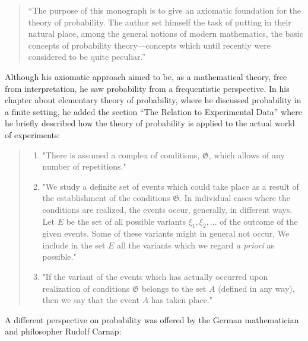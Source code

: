 \documentclass[
]{report}
\theoremstyle{definition}
\begin{document}
\begin{quote}
“The purpose of this monograph is to give an axiomatic foundation for the theory of probability. The author set himself the task of putting in their natural place, among the general notions of modern mathematics, the basic concepts of probability theory—concepts which until recently were considered to be quite peculiar.” \cite{a_n_kolmogorov_foundations_1950}
\end{quote}

Although his axiomatic approach aimed to be, as a mathematical theory,
free from interpretation, he saw probability from a frequentistic
perspective. In his chapter about elementary theory of probability,
where he discussed probability in a finite setting, he added the section
``The Relation to Experimental Data'' where he briefly described how the
theory of probability is applied to the actual world of experiments:

\begin{quote}
\begin{enumerate}[label=\arabic*)]
  \item "There is assumed a complex of conditions, $\mathfrak{G}$, which allows of any number of repetitions."
  \item "We study a definite set of events which could take place as a result of the establishment of the conditions $\mathfrak{G}$. In individual cases where the conditions are realized, the events occur, generally, in different ways. Let $E$ be the set of all possible variants $\xi_1, \xi_2, ...$ of the outcome of the given events. Some of these variants might in general not occur, We include in the set $E$ all the variants which we regard \textit{a priori} as possible."
  \item "If the variant of the events which has actually occurred upon realization of conditions $\mathfrak{G}$ belongs to the set $A$ (defined in any way), then we say that the event $A$ has taken place."
\end{enumerate}
\end{quote}

A different perspective on probability was offered by the German
mathematician and philosopher Rudolf Carnap:
\end{document}
